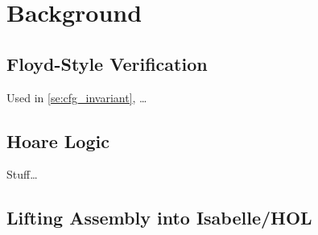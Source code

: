 \chapter{Background}\label{ch:background} 
\section{Floyd-Style Verification}\label{ch:floyd}
Used in \cref{se:cfg_invariant},
\dots

\section{Hoare Logic}
Stuff\dots~\citep{hoare1969axiomatic,myreen2007hoare}

\section{Lifting Assembly into Isabelle/HOL}
